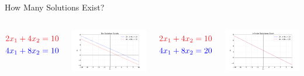 \documentclass[xcolor=dvipsnames,aspectratio=169,t]{beamer}
\begin{document}
\begin{frame}{How Many Solutions Exist?}
  \pause

  \vspace{-1em}
  
  \begin{columns}[b]
    \column{0.5\tw}
      {\small
      \begin{align*}
        & \colorr{2x_1+4x_2=10} \\
        & \colorb{4x_1+8x_2 = 10}
      \end{align*} }
      
      \vspace{-0.3in}
      
      \quad \includegraphics[width=0.8\tw]{images/fig-two-lines3.png}
    
    \column{0.5\tw}
      {\small
      \begin{align*}
        & \colorr{2x_1+4x_2=10} \\
        & \colorb{4x_1+8x_2 = 20}
      \end{align*} }
      
      \vspace{-0.3in}
      
      \quad \includegraphics[width=0.8\tw]{images/fig-two-lines2.png}
  \end{columns}
  

\end{frame}
\end{document}
